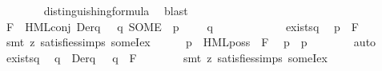 \begin{isabellebody}
\ \ \ \ \ \ \isamarkupfalse%
\ distinguishing{\isacharunderscore}{\kern0pt}formula\ \isamarkupfalse%
\ blast\isanewline
\isanewline
\ \ \ \ \isamarkupfalse%
\ {\isacharquery}{\kern0pt}F\ {\isacharequal}{\kern0pt}\ {\isacartoucheopen}HML{\isacharunderscore}{\kern0pt}conj\ Der{\isacharparenleft}{\kern0pt}q{\isacharcomma}{\kern0pt}\ {\isasymalpha}{\isacharparenright}{\kern0pt}\ {\isacharparenleft}{\kern0pt}{\isasymlambda}\ q{\isacharprime}{\kern0pt}{\isachardot}{\kern0pt}\ SOME\ {\isasymphi}{\isachardot}{\kern0pt}\ p{\isacharprime}{\kern0pt}\ {\isasymTurnstile}\ {\isasymphi}\ {\isasymand}\ {\isasymnot}\ q{\isacharprime}{\kern0pt}\ {\isasymTurnstile}\ {\isasymphi}{\isacharparenright}{\kern0pt}{\isacartoucheclose}\isanewline
\ \ \ \ \isanewline
\ \ \ \ \isamarkupfalse%
\ {\isachardoublequoteopen}exists{\isacharunderscore}{\kern0pt}{\isasymphi}\isactrlbsub q{\isacharprime}{\kern0pt}\isactrlesub {\isachardoublequoteclose}\ \isamarkupfalse%
\ {\isacartoucheopen}p{\isacharprime}{\kern0pt}\ {\isasymTurnstile}\ {\isacharquery}{\kern0pt}F{\isacartoucheclose}\isanewline
\ \ \ \ \ \ \isamarkupfalse%
\ {\isacharparenleft}{\kern0pt}smt\ {\isacharparenleft}{\kern0pt}z{}{\isacharparenright}{\kern0pt}\ satisfies{\isachardot}{\kern0pt}simps{\isacharparenleft}{\kern0pt}{}{\isacharparenright}{\kern0pt}\ someI{\isacharunderscore}{\kern0pt}ex{\isacharparenright}{\kern0pt}\isanewline
\ \ \ \ \isamarkupfalse%
\ {\isacartoucheopen}p\ {\isasymTurnstile}\ HML{\isacharunderscore}{\kern0pt}poss\ {\isasymalpha}\ {\isacharquery}{\kern0pt}F{\isacartoucheclose}\ \isamarkupfalse%
\ {\isacartoucheopen}p\ {\isasymlongmapsto}{\isasymalpha}\ p{\isacharprime}{\kern0pt}{\isacartoucheclose}\isanewline
\ \ \ \ \ \ \isamarkupfalse%
\ auto\isanewline
\isanewline
\ \ \ \ \isamarkupfalse%
\ {\isachardoublequoteopen}exists{\isacharunderscore}{\kern0pt}{\isasymphi}\isactrlbsub q{\isacharprime}{\kern0pt}\isactrlesub {\isachardoublequoteclose}\ \isamarkupfalse%
\ {\isacartoucheopen}{\isasymforall}q{\isacharprime}{\kern0pt}\ {\isasymin}\ Der{\isacharparenleft}{\kern0pt}q{\isacharcomma}{\kern0pt}\ {\isasymalpha}{\isacharparenright}{\kern0pt}{\isachardot}{\kern0pt}\ {\isasymnot}\ q{\isacharprime}{\kern0pt}\ {\isasymTurnstile}\ {\isacharquery}{\kern0pt}F{\isacartoucheclose}\isanewline
\ \ \ \ \ \ \isamarkupfalse%
\ {\isacharparenleft}{\kern0pt}smt\ {\isacharparenleft}{\kern0pt}z{}{\isacharparenright}{\kern0pt}\ satisfies{\isachardot}{\kern0pt}simps{\isacharparenleft}{\kern0pt}{}{\isacharparenright}{\kern0pt}\ someI{\isacharunderscore}{\kern0pt}ex{\isacharparenright}{\kern0pt}\isanewline

\end{isabellebody}
